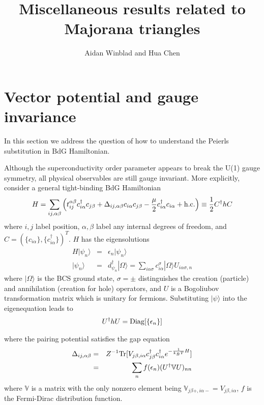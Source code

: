 \documentclass[aps,physrev,amsmath,amssymb]{revtex4-2}
\begin{document}
\title{Miscellaneous results related to Majorana triangles}
\author{Aidan Winblad and Hua Chen}

\maketitle

\section{Vector potential and gauge invariance}
In this section we address the question of how to understand the Peierls substitution in BdG Hamiltonian. 

Although the superconductivity order parameter appears to break the U(1) gauge symmetry, all physical observables are still gauge invariant. More explicitly, consider a general tight-binding BdG Hamiltonian 
\begin{eqnarray}\label{eq:HBdGgeneral}
	H = \sum_{ij,\alpha\beta} \left(t_{ij}^{\alpha\beta}c_{i\alpha}^\dag c_{j\beta} + \Delta_{ij,\alpha\beta} c_{i\alpha}c_{j\beta} - \frac{\mu}{2}c_{i\alpha}^\dag c_{i\alpha} + {\rm h.c.} \right) \equiv \frac{1}{2}C^\dag h C
\end{eqnarray}
where $i,j$ label position, $\alpha,\beta$ label any internal degrees of freedom, and $C = (\{c_{i\alpha}\},\{c^\dag_{i\alpha}\})^T$. $H$ has the eigensolutions
\begin{eqnarray}
	H |\psi_n\rangle &=& \epsilon_n |\psi_n\rangle \\\nonumber
	|\psi_n\rangle &=& d^\dag_{\psi_n} |\Omega\rangle = \sum_{i\alpha\sigma}c^{\sigma}_{i\alpha} | \Omega\rangle U_{i\alpha\sigma,n} 
\end{eqnarray}
where $|\Omega\rangle$ is the BCS ground state, $\sigma=\pm$ distinguishes the creation (particle) and annihilation (creation for hole) operators, and $U$ is a Bogoliubov transformation matrix which is unitary for fermions. Substituting $|\psi\rangle$ into the eigenequation leads to
\begin{eqnarray}
	U^\dag h U = {\rm Diag}[\{\epsilon_n\}]
\end{eqnarray}

where the pairing potential satisfies the gap equation
\begin{eqnarray}
	\Delta_{ij,\alpha\beta} &=& Z^{-1}{\rm Tr}[V_{j\beta,i\alpha}c_{j\beta}^\dag c^\dag_{i\alpha} e^{-\frac{1}{k_B T} H}] \\\nonumber
	&=& \sum_n f(\epsilon_n) (U^\dag {\mathbb{V}} U)_{nn}
\end{eqnarray}
where $\mathbb{V}$ is a matrix with the only nonzero element being $\mathbb{V}_{j\beta+,i\alpha-} = V_{j\beta, i\alpha}$, $f$ is the Fermi-Dirac distribution function. 
\end{document}
